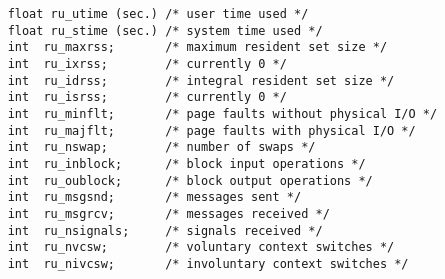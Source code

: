 \begin{refdesc}
{\small
\begin{verbatim}
    float ru_utime (sec.) /* user time used */
    float ru_stime (sec.) /* system time used */
    int  ru_maxrss;       /* maximum resident set size */
    int  ru_ixrss;        /* currently 0 */
    int  ru_idrss;        /* integral resident set size */
    int  ru_isrss;        /* currently 0 */
    int  ru_minflt;       /* page faults without physical I/O */
    int  ru_majflt;       /* page faults with physical I/O */
    int  ru_nswap;        /* number of swaps */
    int  ru_inblock;      /* block input operations */
    int  ru_oublock;      /* block output operations */
    int  ru_msgsnd;       /* messages sent */
    int  ru_msgrcv;       /* messages received */
    int  ru_nsignals;     /* signals received */
    int  ru_nvcsw;        /* voluntary context switches */
    int  ru_nivcsw;       /* involuntary context switches */
\end{verbatim}
}






\end{refdesc}

